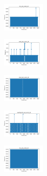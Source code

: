 \vspace*{\fill}
\newpage
\vspace*{\fill}

\begin{figure}[H]    
    \centering
    \begin{subfigure}
        \centering
        \includegraphics[width=0.234\textwidth]{img/agesf/iris_set_const_20_949004259_time.png}
    \end{subfigure}
    \hfill
    \begin{subfigure}
        \centering
        \includegraphics[width=0.234\textwidth]{img/agesf/ecoli_set_const_20_949004259_time.png}
    \end{subfigure}
    \hfill
    \begin{subfigure}
        \centering
        \includegraphics[width=0.234\textwidth]{img/agesf/rand_set_const_20_949004259_time.png}
    \end{subfigure}
    \hfill
    \begin{subfigure}
        \centering
        \includegraphics[width=0.234\textwidth]{img/agesf/newthyroid_set_const_20_949004259_time.png}
    \end{subfigure}
    \hfill
    \begin{subfigure}
        \centering
        \includegraphics[width=0.234\textwidth]{img/agesf/iris_set_const_20_589741062_time.png}

\end{subfigure}
\end{figure}
